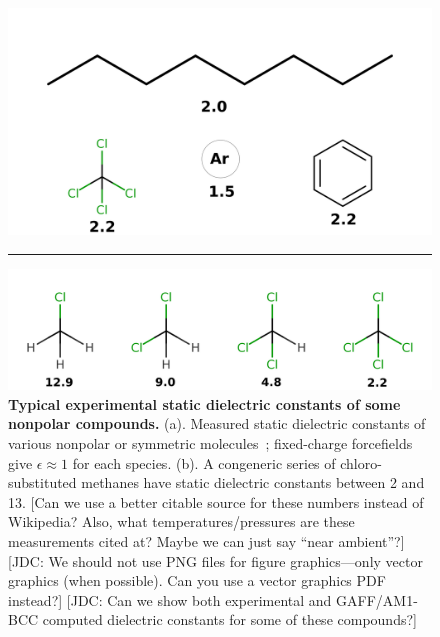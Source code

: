 \documentclass[aps,pre,twocolumn,nofootinbib,superscriptaddress,linenumbers]{revtex4-1}
\begin{document}
\begin{figure}

\includegraphics[width=\columnwidth]{./figures/molecules.png}

\noindent\rule{8cm}{0.4pt}

\includegraphics[width=\columnwidth]{./figures/chlorides.png}

\caption{{\bf Typical experimental static dielectric constants of some nonpolar compounds.}
(a). Measured static dielectric constants of various nonpolar or symmetric molecules~\cite{wikipedia}; fixed-charge forcefields give $\epsilon \approx 1$ for each species.  
(b).  A congeneric series of chloro-substituted methanes have static dielectric constants between 2 and 13.  
{\color{red}[Can we use a better citable source for these numbers instead of Wikipedia?  Also, what temperatures/pressures are these measurements cited at?  Maybe we can just say ``near ambient''?]}
{\color{red}[JDC: We should not use PNG files for figure graphics---only vector graphics (when possible).  Can you use a vector graphics PDF instead?]}
{\color{red}[JDC: Can we show both experimental and GAFF/AM1-BCC computed dielectric constants for some of these compounds?]}
}
\label{figure:nonpolars}

\end{figure}

\end{document}
